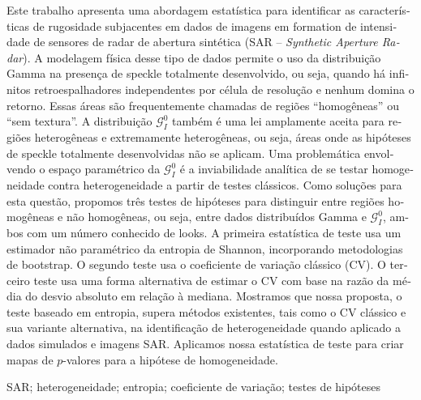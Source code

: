 \begin{otherlanguage}{portuguese} 


\begin{resumo}
{}

Este trabalho apresenta uma abordagem estatística para identificar as características de rugosidade subjacentes em dados de imagens em formation de intensidade de sensores de radar de abertura sintética (SAR -- \textit{Synthetic Aperture Radar}). 
A modelagem física desse tipo de dados permite o uso da distribuição Gamma na presença de speckle totalmente desenvolvido, ou seja, quando há infinitos retroespalhadores independentes por célula de resolução e nenhum domina o retorno.
Essas áreas são frequentemente chamadas de regiões ``homogêneas'' ou ``sem textura''. 
A distribuição $\mathcal{G}_I^0$ também é uma lei amplamente aceita para regiões heterogêneas e extremamente heterogêneas, ou seja, áreas onde as hipóteses de speckle totalmente desenvolvidas não se aplicam.
Uma problemática envolvendo o espaço paramétrico da $\mathcal{G}_I^0$ é a inviabilidade analítica de se testar homogeneidade contra heterogeneidade a partir de testes clássicos. 
Como soluções para esta questão, propomos três testes de hipóteses  para distinguir entre regiões homogêneas e não homogêneas, ou seja, entre dados distribuídos Gamma e $\mathcal{G}_I^0$, ambos com um número conhecido de looks.
A primeira estatística de teste usa um estimador não paramétrico da entropia de Shannon, incorporando metodologias de bootstrap.
O segundo teste usa o coeficiente de variação clássico (CV). 
O terceiro teste usa uma forma alternativa de estimar o CV com base na razão da média do desvio absoluto em relação à mediana.
Mostramos que nossa proposta, o teste baseado em entropia, supera métodos existentes, tais como o CV clássico e sua variante alternativa, na identificação de heterogeneidade quando aplicado a dados simulados e imagens SAR.
Aplicamos nossa estatística de teste para criar mapas de $p$-valores para a hipótese de homogeneidade. 

\end{resumo}

\begin{keywords}
SAR; heterogeneidade; entropia; coeficiente de variação; testes de hipóteses
\end{keywords}


\end{otherlanguage}

